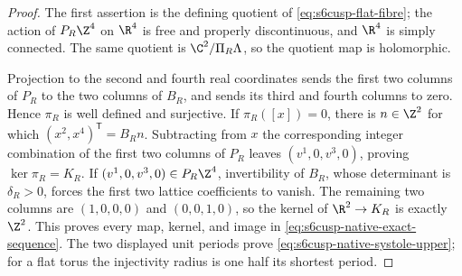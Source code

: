 \begin{proof}
The first assertion is the defining quotient of
\eqref{eq:s6cusp-flat-fibre}; the action of \(P_R\Z^4\) on \(\R^4\) is
free and properly discontinuous, and \(\R^4\) is simply connected.
The same quotient is \(\C^2/\Pi_R\Lambda\), so the quotient map is
holomorphic.

Projection to the second and fourth real coordinates sends the first two
columns of \(P_R\) to the two columns of \(B_R\), and sends its third and
fourth columns to zero.  Hence \(\pi_R\) is well defined and surjective.
If \(\pi_R([x])=0\), there is \(n\in\Z^2\) for which
\((x^2,x^4)^{\mathsf T}=B_Rn\).  Subtracting from \(x\) the corresponding
integer combination of the first two columns of \(P_R\) leaves
\((v^1,0,v^3,0)\), proving \(\ker\pi_R=K_R\).
If \((v^1,0,v^3,0)\in P_R\Z^4\), invertibility of \(B_R\), whose
determinant is \(\delta_R>0\), forces the first two lattice coefficients
to vanish.  The remaining two columns are
\((1,0,0,0)\) and \((0,0,1,0)\), so the kernel of
\(\R^2\to K_R\) is exactly \(\Z^2\).  This proves every map, kernel, and
image in \eqref{eq:s6cusp-native-exact-sequence}.  The two displayed unit
periods prove \eqref{eq:s6cusp-native-systole-upper}; for a flat torus the
injectivity radius is one half its shortest period.


\end{proof}
